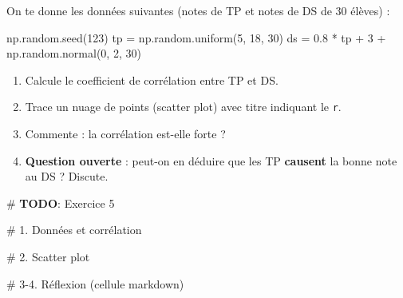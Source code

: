 \documentclass[
  french,
  11pt,
  a4paper,
]{scrbook}
\newenvironment{Shaded}{}{}
\newcommand{\AlertTok}[1]{\textcolor[rgb]{1.00,0.33,0.33}{\textbf{#1}}}
\newcommand{\CommentTok}[1]{\textcolor[rgb]{0.42,0.45,0.49}{#1}}
\newcommand{\DecValTok}[1]{\textcolor[rgb]{0.00,0.36,0.77}{#1}}
\newcommand{\FloatTok}[1]{\textcolor[rgb]{0.00,0.36,0.77}{#1}}
\newcommand{\NormalTok}[1]{\textcolor[rgb]{0.14,0.16,0.18}{#1}}
\newcommand{\OperatorTok}[1]{\textcolor[rgb]{0.14,0.16,0.18}{#1}}
\providecommand{\tightlist}{%
  \setlength{\itemsep}{0pt}\setlength{\parskip}{0pt}}
\begin{document}
\begin{tcolorbox}[enhanced jigsaw, arc=.35mm, bottomrule=.15mm, bottomtitle=1mm, breakable, colback=white, colbacktitle=quarto-callout-note-color!10!white, colframe=quarto-callout-note-color-frame, coltitle=black, left=2mm, leftrule=.75mm, opacityback=0, opacitybacktitle=0.6, rightrule=.15mm, title={📝 Énoncé}, titlerule=0mm, toprule=.15mm, toptitle=1mm]

On te donne les données suivantes (notes de TP et notes de DS de 30
élèves) :

\begin{Shaded}
\begin{Highlighting}[]
\NormalTok{np.random.seed(}\DecValTok{123}\NormalTok{)}
\NormalTok{tp }\OperatorTok{=}\NormalTok{ np.random.uniform(}\DecValTok{5}\NormalTok{, }\DecValTok{18}\NormalTok{, }\DecValTok{30}\NormalTok{)}
\NormalTok{ds }\OperatorTok{=} \FloatTok{0.8} \OperatorTok{*}\NormalTok{ tp }\OperatorTok{+} \DecValTok{3} \OperatorTok{+}\NormalTok{ np.random.normal(}\DecValTok{0}\NormalTok{, }\DecValTok{2}\NormalTok{, }\DecValTok{30}\NormalTok{)}
\end{Highlighting}
\end{Shaded}

\begin{enumerate}
\def\labelenumi{\arabic{enumi}.}
\tightlist
\item
  Calcule le coefficient de corrélation entre TP et DS.
\item
  Trace un nuage de points (scatter plot) avec titre indiquant le
  \texttt{r}.
\item
  Commente : la corrélation est-elle forte ?
\item
  \textbf{Question ouverte} : peut-on en déduire que les TP
  \textbf{causent} la bonne note au DS ? Discute.
\end{enumerate}

\end{tcolorbox}

\begin{Shaded}
\begin{Highlighting}[]
\CommentTok{\# }\AlertTok{TODO}\CommentTok{: Exercice 5}

\CommentTok{\# 1. Données et corrélation}


\CommentTok{\# 2. Scatter plot}


\CommentTok{\# 3{-}4. Réflexion (cellule markdown)}
\end{Highlighting}
\end{Shaded}
\end{document}
